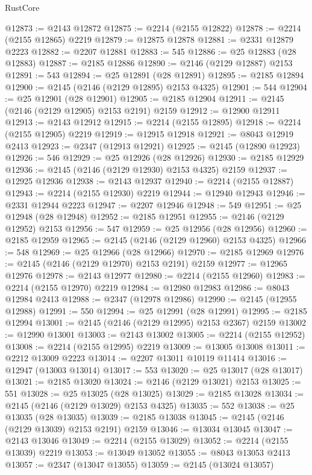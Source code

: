 \begin{lexlean}{RustCore}
\begin{coremodule}
@12873 := @2143 @12872
@12875 := @2214 (@2155 @12822)
@12878 := @2214 (@2155 @12865) @2219
@12879 := @12875 @12878
@12881 := @2331 @12879 @2223
@12882 := @2207 @12881
@12883 := 545
@12886 := @25 @12883 (@28 @12883)
@12887 := @2185 @12886
@12890 := @2146 (@2129 @12887) @2153
@12891 := 543
@12894 := @25 @12891 (@28 @12891)
@12895 := @2185 @12894
@12900 := @2145 (@2146 (@2129 @12895) @2153 @4325)
@12901 := 544
@12904 := @25 @12901 (@28 @12901)
@12905 := @2185 @12904
@12911 := @2145 (@2146 (@2129 @12905) @2153 @2191) @2159
@12912 := @12900 @12911
@12913 := @2143 @12912
@12915 := @2214 (@2155 @12895)
@12918 := @2214 (@2155 @12905) @2219
@12919 := @12915 @12918
@12921 := @8043 @12919 @2413
@12923 := @2347 (@12913 @12921)
@12925 := @2145 (@12890 @12923)
@12926 := 546
@12929 := @25 @12926 (@28 @12926)
@12930 := @2185 @12929
@12936 := @2145 (@2146 (@2129 @12930) @2153 @4325) @2159
@12937 := @12925 @12936
@12938 := @2143 @12937
@12940 := @2214 (@2155 @12887)
@12943 := @2214 (@2155 @12930) @2219
@12944 := @12940 @12943
@12946 := @2331 @12944 @2223
@12947 := @2207 @12946
@12948 := 549
@12951 := @25 @12948 (@28 @12948)
@12952 := @2185 @12951
@12955 := @2146 (@2129 @12952) @2153
@12956 := 547
@12959 := @25 @12956 (@28 @12956)
@12960 := @2185 @12959
@12965 := @2145 (@2146 (@2129 @12960) @2153 @4325)
@12966 := 548
@12969 := @25 @12966 (@28 @12966)
@12970 := @2185 @12969
@12976 := @2145 (@2146 (@2129 @12970) @2153 @2191) @2159
@12977 := @12965 @12976
@12978 := @2143 @12977
@12980 := @2214 (@2155 @12960)
@12983 := @2214 (@2155 @12970) @2219
@12984 := @12980 @12983
@12986 := @8043 @12984 @2413
@12988 := @2347 (@12978 @12986)
@12990 := @2145 (@12955 @12988)
@12991 := 550
@12994 := @25 @12991 (@28 @12991)
@12995 := @2185 @12994
@13001 := @2145 (@2146 (@2129 @12995) @2153 @2367) @2159
@13002 := @12990 @13001
@13003 := @2143 @13002
@13005 := @2214 (@2155 @12952)
@13008 := @2214 (@2155 @12995) @2219
@13009 := @13005 @13008
@13011 := @2212 @13009 @2223
@13014 := @2207 @13011 @10119 @11414
@13016 := @12947 (@13003 @13014)
@13017 := 553
@13020 := @25 @13017 (@28 @13017)
@13021 := @2185 @13020
@13024 := @2146 (@2129 @13021) @2153
@13025 := 551
@13028 := @25 @13025 (@28 @13025)
@13029 := @2185 @13028
@13034 := @2145 (@2146 (@2129 @13029) @2153 @4325)
@13035 := 552
@13038 := @25 @13035 (@28 @13035)
@13039 := @2185 @13038
@13045 := @2145 (@2146 (@2129 @13039) @2153 @2191) @2159
@13046 := @13034 @13045
@13047 := @2143 @13046
@13049 := @2214 (@2155 @13029)
@13052 := @2214 (@2155 @13039) @2219
@13053 := @13049 @13052
@13055 := @8043 @13053 @2413
@13057 := @2347 (@13047 @13055)
@13059 := @2145 (@13024 @13057)

\end{coremodule}
\end{lexlean}
